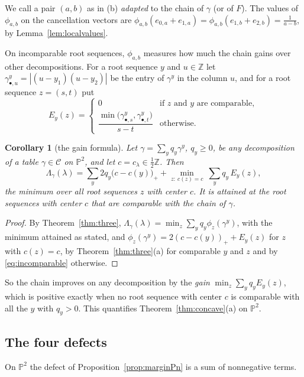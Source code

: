 \documentclass[11pt]{amsart}
\newtheorem{corollary}[theorem]{Corollary}
\theoremstyle{definition}
\theoremstyle{remark}
\newcommand{\PP}{\mathbb{P}}
\newcommand{\ZZ}{\mathbb{Z}}
\newcommand{\CC}{\mathcal{C}}
\begin{document}
We call a pair $(a,b)$ as in (b) \emph{adapted} to the chain of $\gamma$ (or of $F$). The values of $\phi_{a,b}$ on the cancellation vectors are $\phi_{a,b}(e_{0,a}+e_{1,a})=\phi_{a,b}(e_{1,b}+e_{2,b})=\frac1{a-b}$, by Lemma~\ref{lem:localvalues}.

On incomparable root sequences, $\phi_{a,b}$ measures how much the chain gains over other decompositions. For a root sequence $y$ and $u\in\ZZ$ let $\gamma^y_{\bullet,u}=|(u-y_1)(u-y_2)|$ be the entry of $\gamma^y$ in the column $u$, and for a root sequence $z=(s,t)$ put
\[
E_y(z)=\begin{cases}0 & \text{if $z$ and $y$ are comparable},\\[1ex] \dfrac{\min\big(\gamma^y_{\bullet,s},\gamma^y_{\bullet,t}\big)}{s-t} & \text{otherwise}.\end{cases}
\]

\begin{corollary}[the gain formula]\label{cor:gain}
Let $\gamma=\sum_yq_y\gamma^y$, $q_y\ge0$, be any decomposition of a table $\gamma\in\CC$ on $\PP^2$, and let $c=c_\lambda\in\frac12\ZZ$. Then
\[
\Lambda_\gamma(\lambda)=\sum_y2q_y\big(c-c(y)\big)_++\min_{z:\ c(z)=c}\ \sum_yq_y\,E_y(z),
\]
the minimum over all root sequences $z$ with center $c$. It is attained at the root sequences with center $c$ that are comparable with the chain of $\gamma$.
\end{corollary}

\begin{proof}
By Theorem~\ref{thm:three}, $\Lambda_\gamma(\lambda)=\min_z\sum_yq_y\phi_z(\gamma^y)$, with the minimum attained as stated, and $\phi_z(\gamma^y)=2(c-c(y))_++E_y(z)$ for $z$ with $c(z)=c$, by Theorem~\ref{thm:three}(a) for comparable $y$ and $z$ and by \eqref{eq:incomparable} otherwise.
\end{proof}

So the chain improves on any decomposition by the \emph{gain} $\min_z\sum_yq_yE_y(z)$, which is positive exactly when no root sequence with center $c$ is comparable with all the $y$ with $q_y>0$. This quantifies Theorem~\ref{thm:concave}(a) on $\PP^2$.

\subsection{The four defects}
On $\PP^2$ the defect of Proposition~\ref{prop:marginPn} is a sum of nonnegative terms.
\end{document}
